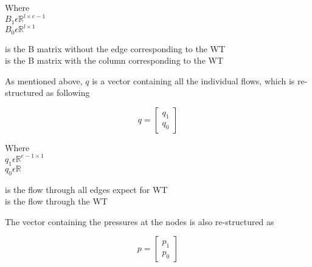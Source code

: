 \begin{minipage}[t]{0.20\textwidth}
Where\\
\hspace*{8mm} $B_1 \epsilon \mathbb{R}^{l \times e-1}$  \\
\hspace*{8mm} $B_0 \epsilon \mathbb{R}^{l \times 1} $ 
\end{minipage}
\begin{minipage}[t]{0.68\textwidth}
\vspace*{2mm}
\hspace*{4mm} is the B matrix without the edge corresponding to the WT\\
\hspace*{4mm} is the B matrix with the column corresponding to the WT 
\end{minipage}

As mentioned above, $q$ is a vector containing all the individual flows, which 
is re-structured as following

\begin{equation}
q =
\begin{bmatrix}
         q_1 \\
	q_0 
\end{bmatrix}
\label{qmatrix}
\end{equation}

\begin{minipage}[t]{0.20\textwidth}
Where\\
\hspace*{8mm} $q_1 \epsilon \mathbb{R}^{e-1 \times 1}$  \\
\hspace*{8mm} $q_0 \epsilon \mathbb{R} $ 
\end{minipage}
\begin{minipage}[t]{0.68\textwidth}
\vspace*{2mm}
\hspace*{4mm} is the flow through all edges expect for WT\\
\hspace*{4mm} is the flow through the WT 
\end{minipage}

The vector containing the pressures at the nodes is also re-structured as

\begin{equation}
p =
\begin{bmatrix}
         p_1 \\
	p_0 
\end{bmatrix}
\end{equation}

